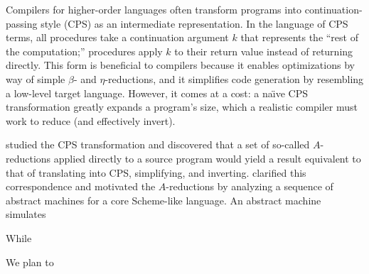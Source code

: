 \documentclass[11pt]{article}
\begin{document}
\thispagestyle{fancy}

Compilers for higher-order languages often transform programs into
continuation-passing style (CPS) as an intermediate representation. In the
language of CPS terms, all procedures take a continuation argument $k$
that represents the ``rest of the computation;'' procedures apply $k$ to their
return value instead of returning directly. This form is beneficial to
compilers because it enables optimizations by way of simple $\beta$- and
$\eta$-reductions, and it simplifies code generation by resembling a low-level
target language. However, it comes at a cost: a na\"{\i}ve CPS transformation
greatly expands a program's size, which a realistic compiler must work to
reduce (and effectively invert).

\citet{Sabry:1992zr} studied the CPS transformation and discovered that a set
of so-called $A$-reductions applied directly to a source program would yield
a result equivalent  to that of translating into CPS, simplifying,
and inverting. \citet{Flanagan:1993fk} clarified this correspondence and
motivated the $A$-reductions by analyzing a sequence of abstract machines for
a core Scheme-like language. An abstract machine simulates 

While

We plan to




\end{document}

